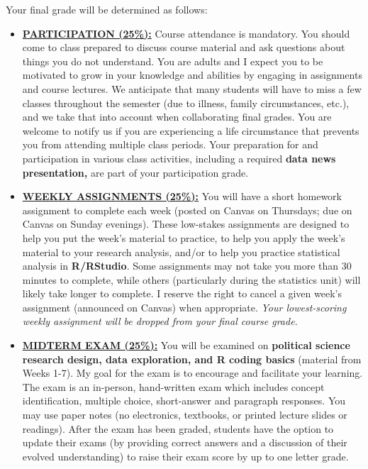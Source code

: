 \documentclass[11pt]{article}
\begin{document}
\noindent Your final grade will be determined as follows:
\begin{itemize}
	\item \underline{\textbf{PARTICIPATION (25\%):}} Course attendance is mandatory. You should come to class prepared to discuss course material and ask questions about things you do not understand. You are adults and I expect you to be motivated to grow in your knowledge and abilities by engaging in assignments and course lectures. We anticipate that many students will have to miss a few classes throughout the semester (due to illness, family circumstances, etc.), and we take that into account when collaborating final grades. You are welcome to notify us if you are experiencing a life circumstance that prevents you from attending multiple class periods. Your preparation for and participation in various class activities, including a required \textbf{data news presentation,} are part of your participation grade. 
	
	\item \underline{\textbf{WEEKLY ASSIGNMENTS (25\%):}} You will have a  short homework assignment to complete each week (posted on Canvas on Thursdays; due on Canvas on Sunday evenings). These low-stakes assignments are designed to help you put the week's material to practice, to help you apply the week's material to your research analysis, and/or to help you practice statistical analysis in \textbf{\textsf{R/RStudio}}. Some assignments may not take you more than 30 minutes to complete, while others (particularly during the statistics unit) will likely take longer to complete. I reserve the right to cancel a given week's assignment (announced on Canvas) when appropriate. \textit{Your lowest-scoring weekly assignment will be dropped from your final course grade.}
	
	\item \underline{\textbf{MIDTERM EXAM (25\%):}} You will be examined on \textbf{political science research design, data exploration, and \textsf{R} coding basics} (material from Weeks 1-7). My goal for the exam is to encourage and facilitate your learning. The exam is an in-person, hand-written exam which includes concept identification, multiple choice, short-answer and paragraph responses. You may use paper notes (no electronics, textbooks, or printed lecture slides or readings). After the exam has been graded, students have the option to update their exams (by providing correct answers and a discussion of their evolved understanding) to raise their exam score by up to one letter grade.%
	

\end{itemize}
\end{document}
